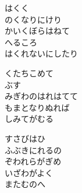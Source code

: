 \documentclass[10pt,b5j]{tarticle} %
\begin{document}
\begin{enumerate}
\begin{minipage}[c]{\blocksize}
        \vspace{\linespace}
        \item
        はくく\\
        のくなりにけり\\
        かいくぼらはねて\\
        へるころ\\
        はくれないにしたり
        
        \vspace{\linespace}
        \item
        くたちこめて\\
        ぶす\\
        みぎわのはれはてて\\
        もまとなりぬれば\\
        しみてがむる
        
        \vspace{\linespace}
        \item
        すさびはひ\\
        ふぶきにれるの\\
        ぞわれらがぎめ\\
        いざわがよく\\
        またむのへ
    
    \end{minipage}
\end{enumerate} %
\end{document}
